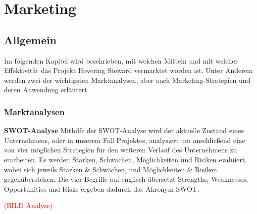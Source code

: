 \chapter{Marketing}
\renewcommand{\kapitelautor}{Autor: Markus Kaiser}

\section{Allgemein}
Im folgenden Kapitel wird beschrieben, mit welchen Mitteln und mit welcher Effektivität
das Projekt Hovering Steward vermarktet worden ist. Unter Anderem werden zwei der wichtigsten Marktanalysen,
aber auch Marketing-Strategien und deren Anwendung erläutert.

  \subsection{Marktanalysen}
  \textbf{SWOT-Analyse}
  Mithilfe der SWOT-Analyse wird der aktuelle Zustand eines Unternehmens, oder in unserem Fall Projektes, analysiert um anschließend eine von vier möglichen Strategien
  für den weiteren Verlauf des Unternehmens zu erarbeiten. Es werden Stärken, Schwächen, Möglichkeiten und Risiken evaluiert, wobei sich jeweils Stärken \& Schwächen, und
  Möglichkeiten \& Risiken gegenüberstehen. Die vier Begriffe auf englisch übersetzt Strengths, Weaknesses, Opportunities und Risks ergeben dadurch das Akronym SWOT.

  \textcolor{red}{(BILD Analyse)}

